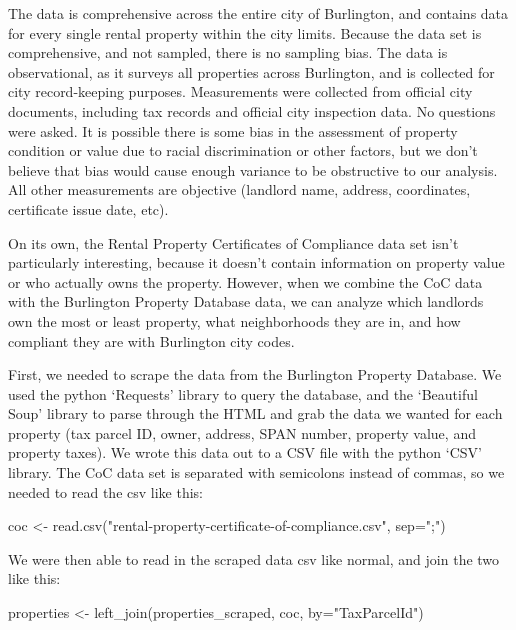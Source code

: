 \documentclass[
]{article}
\newenvironment{Shaded}{\begin{snugshade}}{\end{snugshade}}
\newcommand{\AttributeTok}[1]{\textcolor[rgb]{0.77,0.63,0.00}{#1}}
\newcommand{\FunctionTok}[1]{\textcolor[rgb]{0.00,0.00,0.00}{#1}}
\newcommand{\NormalTok}[1]{#1}
\newcommand{\OtherTok}[1]{\textcolor[rgb]{0.56,0.35,0.01}{#1}}
\newcommand{\StringTok}[1]{\textcolor[rgb]{0.31,0.60,0.02}{#1}}
\begin{document}
The data is comprehensive across the entire city of Burlington, and
contains data for every single rental property within the city limits.
Because the data set is comprehensive, and not sampled, there is no
sampling bias. The data is observational, as it surveys all properties
across Burlington, and is collected for city record-keeping purposes.
Measurements were collected from official city documents, including tax
records and official city inspection data. No questions were asked. It
is possible there is some bias in the assessment of property condition
or value due to racial discrimination or other factors, but we don't
believe that bias would cause enough variance to be obstructive to our
analysis. All other measurements are objective (landlord name, address,
coordinates, certificate issue date, etc).

On its own, the Rental Property Certificates of Compliance data set
isn't particularly interesting, because it doesn't contain information
on property value or who actually owns the property. However, when we
combine the CoC data with the Burlington Property Database data, we can
analyze which landlords own the most or least property, what
neighborhoods they are in, and how compliant they are with Burlington
city codes.

First, we needed to scrape the data from the Burlington Property
Database. We used the python `Requests' library to query the database,
and the `Beautiful Soup' library to parse through the HTML and grab the
data we wanted for each property (tax parcel ID, owner, address, SPAN
number, property value, and property taxes). We wrote this data out to a
CSV file with the python `CSV' library. The CoC data set is separated
with semicolons instead of commas, so we needed to read the csv like
this:

\begin{Shaded}
\begin{Highlighting}[]
\NormalTok{coc }\OtherTok{\textless{}{-}} \FunctionTok{read.csv}\NormalTok{(}\StringTok{"rental{-}property{-}certificate{-}of{-}compliance.csv"}\NormalTok{, }\AttributeTok{sep=}\StringTok{";"}\NormalTok{)}
\end{Highlighting}
\end{Shaded}

We were then able to read in the scraped data csv like normal, and join
the two like this:

\begin{Shaded}
\begin{Highlighting}[]
\NormalTok{properties }\OtherTok{\textless{}{-}} \FunctionTok{left\_join}\NormalTok{(properties\_scraped, coc, }\AttributeTok{by=}\StringTok{"TaxParcelId"}\NormalTok{)}
\end{Highlighting}
\end{Shaded}
\end{document}
